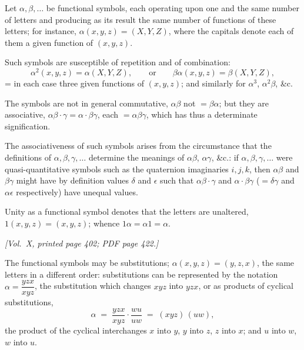 \documentclass[11pt]{article}
\begin{document}
\medskip

Let $\alpha, \beta, \ldots$ be functional symbols, each operating upon one and the same number of letters and producing as its result the same number of functions of these letters; for instance, $\alpha(x, y, z) = (X, Y, Z)$, where the capitals denote each of them a given function of $(x, y, z)$.

\medskip

Such symbols are susceptible of repetition and of combination:
\[
\alpha^{2}(x, y, z) = \alpha(X, Y, Z), \qquad \text{or}\qquad \beta\alpha(x, y, z) = \beta(X, Y, Z),
\]
= in each case three given functions of $(x, y, z)$; and similarly for $\alpha^{3}$, $\alpha^{2}\beta$, \&c.

\medskip

The symbols are not in general commutative, $\alpha\beta$ not $=\beta\alpha$; but they are associative, $\alpha\beta\cdot\gamma = \alpha\cdot\beta\gamma$, each $=\alpha\beta\gamma$, which has thus a determinate signification.

\medskip

The associativeness of such symbols arises from the circumstance that the definitions of $\alpha, \beta, \gamma, \ldots$ determine the meanings of $\alpha\beta$, $\alpha\gamma$, \&c.: if $\alpha, \beta, \gamma, \ldots$ were quasi-quantitative symbols such as the quaternion imaginaries $i, j, k$, then $\alpha\beta$ and $\beta\gamma$ might have by definition values $\delta$ and $\epsilon$ such that $\alpha\beta\cdot\gamma$ and $\alpha\cdot\beta\gamma$ ($=\delta\gamma$ and $\alpha\epsilon$ respectively) have unequal values.

\medskip

Unity as a functional symbol denotes that the letters are unaltered, $1(x,y,z) = (x, y, z)$; whence $1\alpha = \alpha 1 = \alpha$.

\newpage

\noindent\textit{[Vol.~X, printed page 402; PDF page 422.]}

\medskip

The functional symbols may be substitutions; $\alpha(x, y, z) = (y, z, x)$, the same letters in a different order: substitutions can be represented by the notation $\alpha = \dfrac{yzx}{xyz}$, the substitution which changes $xyz$ into $yzx$, or as products of cyclical substitutions,
\[
\alpha \;=\; \dfrac{yzx}{xyz}\cdot \dfrac{wu}{uw} \;=\; (xyz)\,(uw),
\]
the product of the cyclical interchanges $x$ into $y$, $y$ into $z$, $z$ into $x$; and $u$ into $w$, $w$ into $u$.
\end{document}
